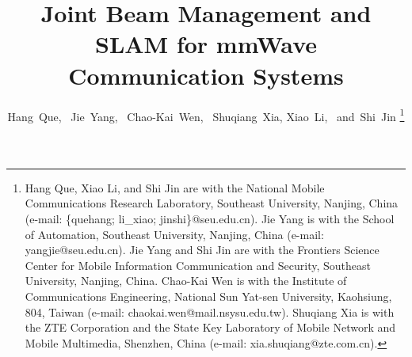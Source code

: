 \documentclass[journal,12pt,onecolumn,draftclsnofoot,]{IEEEtran}
\begin{document}
\title{ Joint Beam Management and SLAM for mmWave Communication Systems
}


\author{
Hang~Que,~%
Jie~Yang,~%
Chao-Kai~Wen,~%
Shuqiang~Xia, 
Xiao~Li,~%
and~Shi~Jin%
\thanks{Hang Que, Xiao Li, and Shi Jin are with the National Mobile Communications Research Laboratory, Southeast University, Nanjing, China (e-mail: \{quehang; li\_xiao; jinshi\}@seu.edu.cn). 
Jie Yang is with the School of Automation, Southeast University, Nanjing, China (e-mail: yangjie@seu.edu.cn). 
Jie Yang and Shi Jin are with the Frontiers Science Center for Mobile Information Communication and Security, Southeast University, Nanjing, China. 
Chao-Kai Wen is with the Institute of Communications Engineering, National Sun Yat-sen University, Kaohsiung, 804, Taiwan (e-mail: chaokai.wen@mail.nsysu.edu.tw). 
Shuqiang Xia is with the ZTE Corporation and the State Key Laboratory of Mobile Network and Mobile Multimedia, Shenzhen, China (e-mail: xia.shuqiang@zte.com.cn). 
}
}





\end{document}
